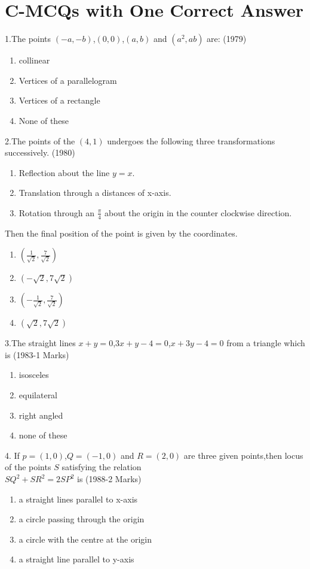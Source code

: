 \documentclass[journal,12pt,twocolumn]{IEEEtran}
\theoremstyle{remark}
\begin{document}
\section {C-MCQs with One Correct Answer}
1.The points $(-a,-b)$,$(0,0)$,$(a,b)$ and $(a^2,ab)$ are:
\hfill(1979)
\begin{enumerate}
    \item collinear
    \item Vertices of a parallelogram
    \item Vertices of a rectangle 
    \item None of these
    \end{enumerate}
2.The points of the $(4,1)$ undergoes the following three transformations successively.
\hfill(1980)
\begin{enumerate}
    \item Reflection about the line $y=x.$
    \item Translation through a distances of x-axis.
    \item Rotation through an $\frac{\pi}{4}$ about the origin in the counter clockwise direction.
\end{enumerate}
    Then the final position of the point is given by the coordinates.
\begin{enumerate}
    \item $\left(\frac{1}{\sqrt{2}},\frac{7}{\sqrt{2}} \right)$
    \item $(-\sqrt{2},7\sqrt{2})$
    \item $\left(-\frac{1}{\sqrt{2}},\frac{7}{\sqrt{2}} \right)$
    \item $(\sqrt{2},7\sqrt{2})$
\end{enumerate}
3.The straight lines $x+y=0$,$3x+y-4=0$,$x+3y-4=0$ from a triangle which is 
\hfill(1983-1 Marks)
\begin{enumerate}
    \item isosceles
    \item equilateral 
    \item right angled
    \item none of these
\end{enumerate}
4. If $p=(1,0)$,$Q=(-1,0)$ and $R=(2,0)$ are three given points,then locus of the points $S$ satisfying the relation\\
    $SQ^2+SR^2=2SP^2$ is 
\hfill(1988-2 Marks)
\begin{enumerate}
    \item a straight lines parallel to x-axis
    \item a circle passing through the origin
    \item a circle with the centre at the origin 
    \item a straight line parallel to y-axis
\end{enumerate}
\end{document}
